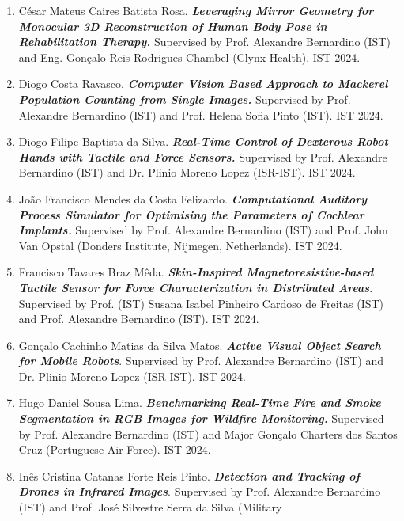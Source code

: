 \documentclass[
]{article}
\begin{document}
\begin{enumerate}
  Bruno Miguel da Silva Cebola. \emph{\textbf{Comparative Analysis of
  Approaches to Perform Human Activity Recognition in Public
  Transportation Hubs.}} Supervised by Prof. Alexandre Bernardino (IST)
  and Eng. João Tiago Pinto de Almeida Dias Fonseca (Thales Portugal).
  IST 2024.
\item
  César Mateus Caires Batista Rosa. \emph{\textbf{Leveraging Mirror
  Geometry for Monocular 3D Reconstruction of Human Body Pose in
  Rehabilitation Therapy.}} Supervised by Prof. Alexandre Bernardino
  (IST) and Eng. Gonçalo Reis Rodrigues Chambel (Clynx Health). IST
  2024.
\item
  Diogo Costa Ravasco. \emph{\textbf{Computer Vision Based Approach to
  Mackerel Population Counting from Single Images.}} Supervised by Prof.
  Alexandre Bernardino (IST) and Prof. Helena Sofia Pinto (IST). IST
  2024.
\item
  Diogo Filipe Baptista da Silva. \emph{\textbf{Real-Time Control of
  Dexterous Robot Hands with Tactile and Force Sensors.}} Supervised by
  Prof. Alexandre Bernardino (IST) and Dr. Plinio Moreno Lopez
  (ISR-IST). IST 2024.
\item
  João Francisco Mendes da Costa Felizardo. \emph{\textbf{Computational
  Auditory Process Simulator for Optimising the Parameters of Cochlear
  Implants.}} Supervised by Prof. Alexandre Bernardino (IST) and Prof.
  John Van Opstal (Donders Institute, Nijmegen, Netherlands). IST 2024.
\item
  Francisco Tavares Braz Mêda. \emph{\textbf{Skin-Inspired
  Magnetoresistive-based Tactile Sensor for Force Characterization in
  Distributed Areas}}. Supervised by Prof. (IST) Susana Isabel Pinheiro
  Cardoso de Freitas (IST) and Prof. Alexandre Bernardino (IST). IST
  2024.
\item
  Gonçalo Cachinho Matias da Silva Matos. \emph{\textbf{Active Visual
  Object Search for Mobile Robots}}. Supervised by Prof. Alexandre
  Bernardino (IST) and Dr. Plinio Moreno Lopez (ISR-IST). IST 2024.
\item
  Hugo Daniel Sousa Lima. \emph{\textbf{Benchmarking Real-Time Fire and
  Smoke Segmentation in RGB Images for Wildfire Monitoring.}} Supervised
  by Prof. Alexandre Bernardino (IST) and Major Gonçalo Charters dos
  Santos Cruz (Portuguese Air Force). IST 2024.
\item
  Inês Cristina Catanas Forte Reis Pinto. \emph{\textbf{Detection and
  Tracking of Drones in Infrared Images}}. Supervised by Prof. Alexandre
  Bernardino (IST) and Prof. José Silvestre Serra da Silva (Military

\end{enumerate}
\end{document}
